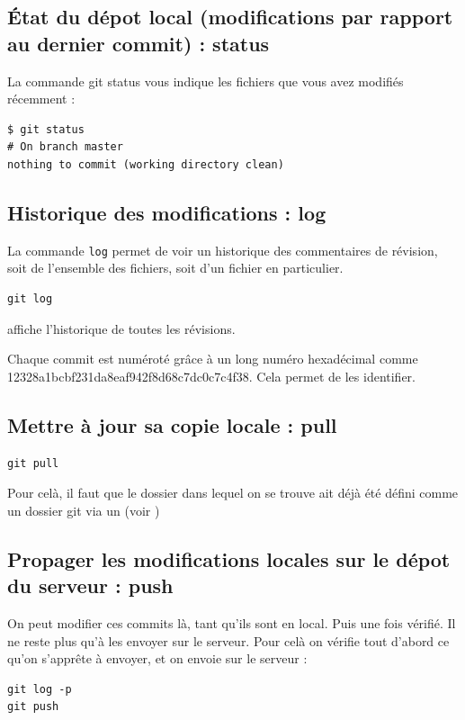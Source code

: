 \documentclass[a4paper,twoside]{article}
\begin{document}
\subsection{État du dépot local (modifications par rapport au dernier commit) : status}
La commande git status vous indique les fichiers que vous avez modifiés récemment :
\begin{verbatim}
$ git status
# On branch master
nothing to commit (working directory clean)
\end{verbatim}

\subsection{Historique des modifications : log}
La commande \texttt{log} permet de voir un historique des commentaires de révision, soit de l'ensemble des fichiers, soit d'un fichier en particulier.

\begin{verbatim}
git log
\end{verbatim}
affiche l'historique de toutes les révisions.

\begin{attention}
Chaque commit est numéroté grâce à un long numéro hexadécimal comme 12328a1bcbf231da\-8eaf942f8d68c7dc0c7c4f38. Cela permet de les identifier.
\end{attention}

\subsection{Mettre à jour sa copie locale : pull} 
\begin{verbatim}
git pull
\end{verbatim}

Pour celà, il faut que le dossier dans lequel on se trouve ait déjà été défini comme un dossier git via un  (voir )

\subsection{Propager les modifications locales sur le dépot du serveur : push}
On peut modifier ces commits là, tant qu'ils sont en local. Puis une fois vérifié. Il ne reste plus qu'à les envoyer sur le serveur. Pour celà on vérifie tout d'abord ce qu'on s'apprête à envoyer, et on envoie sur le serveur : 
\begin{verbatim}
git log -p
git push
\end{verbatim}
\end{document}
